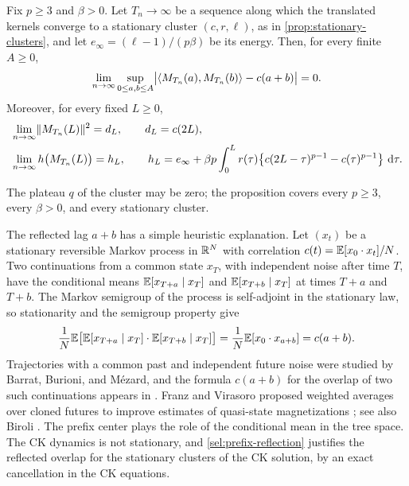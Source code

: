 \begin{proposition}
\label{sel:prefix-reflection}
Fix $p\ge3$ and $\beta>0$. Let $T_n\to\infty$ be a sequence along which the translated kernels converge to a stationary cluster $(c,r,\ell)$, as in \cref{prop:stationary-clusters}, and let $e_\infty=(\ell-1)/(p\beta)$ be its energy. Then, for every finite $A\ge0$,
\begin{equation}
 \lim_{n\to\infty}\sup_{0\le a,b\le A}\bigl|\left\langle M_{T_n}(a),M_{T_n}(b)\right\rangle-c(a+b)\bigr|=0.
 \label{sel:prefix-gram}
\end{equation}
Moreover, for every fixed $L\ge0$,
\begin{align}
 &\lim_{n\to\infty}\lVert M_{T_n}(L)\rVert^2=d_L,\qquad d_L=c(2L),
 \label{sel:prefix-norm}\\
 &\lim_{n\to\infty}h\bigl(M_{T_n}(L)\bigr)=h_L,\qquad
 h_L=e_\infty+\beta p\int_0^Lr(\tau)\bigl\{c(2L-\tau)^{p-1}-c(\tau)^{p-1}\bigr\}\,\mathop{}\!\mathrm d\tau.
 \label{sel:prefix-energy}
\end{align}
\end{proposition}

The plateau $q$ of the cluster may be zero; the proposition covers every $p\ge3$, every $\beta>0$, and every stationary cluster.

\begin{remark}\label{rem:tree-independent-futures}
The reflected lag $a+b$ has a simple heuristic explanation. Let $(x_t)$ be a stationary reversible Markov process in $\mathbb R^N$ with correlation $c(t)=\mathbb E[x_0\cdot x_t]/N$. Two continuations from a common state $x_T$, with independent noise after time $T$, have the conditional means $\mathbb E[x_{T+a}\mid x_T]$ and $\mathbb E[x_{T+b}\mid x_T]$ at times $T+a$ and $T+b$. The Markov semigroup of the process is self-adjoint in the stationary law, so stationarity and the semigroup property give
\[
 \frac1N\mathbb E\bigl[\mathbb E[x_{T+a}\mid x_T]\cdot\mathbb E[x_{T+b}\mid x_T]\bigr]=\frac1N\mathbb E[x_0\cdot x_{a+b}]=c(a+b).
\]
Trajectories with a common past and independent future noise were studied by Barrat, Burioni, and M\'ezard, and the formula $c(a+b)$ for the overlap of two such continuations appears in \cite[equation~(9) and Section~4.1]{bbm1996}. Franz and Virasoro proposed weighted averages over cloned futures to improve estimates of quasi-state magnetizations \cite[arXiv version~3, Section~III]{franzvirasoro2000}; see also Biroli \cite[arXiv version~2, Section~III.B]{biroli1999}. The prefix center plays the role of the conditional mean in the tree space. The CK dynamics is not stationary, and \cref{sel:prefix-reflection} justifies the reflected overlap for the stationary clusters of the CK solution, by an exact cancellation in the CK equations.
\end{remark}

